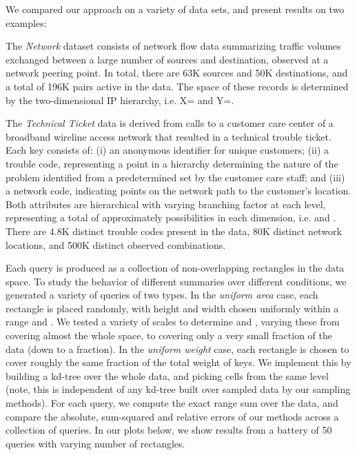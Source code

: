 \documentclass[11pt]{article}
\newcommand{\para}[1]{\medskip \noindent {\bf #1}}
\begin{document}
\para{Data Sets and Query Sets.}
We compared our approach on a variety of data sets,
and present results on two examples:
\begin{trivlist}
\item The {\em Network} dataset consists of network flow data summarizing
  traffic volumes exchanged between a large number of sources and
  destination, observed at a network peering point.
In total, there are 63K sources and 50K destinations, and a total of
196K pairs active in the data.
The space of these records is determined by the two-dimensional IP
hierarchy, i.e. X= and Y=.

\item
The {\em Technical Ticket} data is derived from calls to a customer
care center of a broadband wireline access network that resulted in a
technical trouble ticket. 
Each key consists of: (i) an anonymous identifier for unique
customers; (ii) a trouble code, representing a point in a
hierarchy determining the nature of the problem identified from a
predetermined set by the customer care staff; and (iii) a network code,
indicating points on the network path to the customer's location.  
Both attributes are hierarchical with varying branching factor at each
level, representing a total of approximately  possibilities
in each dimension, i.e.  and . 
There are 4.8K distinct trouble codes present in the data, 
80K distinct network
locations, and 500K distinct observed combinations. 
\end{trivlist}

Each query is produced as a collection of non-overlapping rectangles
in the data space.
To study the behavior of different summaries over
different conditions, we generated a variety of queries of two types. 
In the {\em uniform area} case, 
each rectangle is placed randomly, with height and width chosen
uniformly within a range  and . 
We tested a variety of scales to determine  and , varying these
from covering almost the whole space, to covering only a very small
fraction of the data (down to a  fraction). 
In the {\em uniform weight} case, 
each rectangle is chosen to cover roughly the same fraction of the
total weight of keys.
We implement this by building a kd-tree over the whole data, and
picking cells from the same level (note, this is independent of any
kd-tree built over sampled data by our sampling methods). 
For each query, we compute the exact range sum over the data, and
compare the absolute, sum-squared and relative errors of our methods
across a collection of queries. 
In our plots below, we show results from a battery of 50 queries with
varying number of rectangles.
\end{document}

